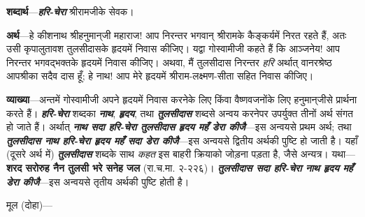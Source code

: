 \parasepone
\begin{sloppypar}\justifying{}
\textbf{शब्दार्थ}—\textbf{\textit{हरि-चेरा}} {} श्रीरामजीके सेवक।
\end{sloppypar}
\begin{sloppypar}\justifying{}
\textbf{अर्थ}—हे कीशनाथ श्रीहनुमान्‌जी महाराज! आप निरन्तर भगवान् श्रीरामके कैङ्कर्यमें निरत रहते हैं, अतः उसी कृपालुतावश तुलसीदासके हृदयमें निवास कीजिए। यद्वा गोस्वामीजी कहते हैं कि आञ्जनेय! आप निरन्तर भगवद्भक्तके हृदयमें निवास कीजिए। अथवा, मैं तुलसीदास निरन्तर \textit{हरि} अर्थात् वानरश्रेष्ठ आपश्रीका सदैव दास हूँ; हे नाथ! आप मेरे हृदयमें श्रीराम-लक्ष्मण-सीता सहित निवास कीजिए।
\end{sloppypar}
\parasepone
{}
\begin{sloppypar}\justifying{}
\textbf{व्याख्या}—अन्तमें गोस्वामीजी अपने हृदयमें निवास करनेके लिए किंवा वैष्णवजनोंके लिए हनुमान्‌जीसे प्रार्थना करते हैं। \textbf{\textit{हरि-चेरा}} शब्दका \textbf{\textit{नाथ}}, \textbf{\textit{हृदय}}, तथा \textbf{\textit{तुलसीदास}} शब्दसे अन्वय करनेपर उपर्युक्त तीनों अर्थ संगत हो जाते हैं। अर्थात् \textbf{\textit{नाथ सदा हरि-चेरा तुलसीदास हृदय महँ डेरा कीजै}}—इस अन्वयसे प्रथम अर्थ; तथा \textbf{\textit{तुलसीदास नाथ हरि-चेरा हृदय महँ सदा डेरा कीजै}}—इस अन्वयसे द्वितीय अर्थकी पुष्टि हो जाती है। यहाँ (दूसरे अर्थ में) \textbf{\textit{तुलसीदास}} शब्दके साथ \textit{कहत} इस बाहरी क्रियाको जोड़ना पड़ता है, जैसे अन्यत्र। यथा—\textbf{शरद सरोरुह नैन तुलसी भरे सनेह जल} (रा.च.मा. २-२२६)। \textbf{\textit{तुलसीदास सदा हरि-चेरा नाथ हृदय महँ डेरा कीजै}}—इस अन्वयसे तृतीय अर्थकी पुष्टि होती है।
\end{sloppypar}
\paraseplotus
\pagebreak


{}
\begin{sloppypar}\justifying{}
मूल (दोहा)—
\end{sloppypar}


